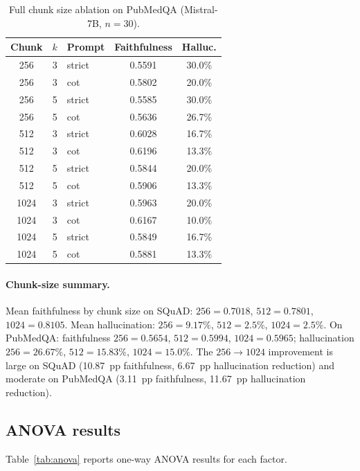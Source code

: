 \begin{table}[!htb]
\centering
\caption{Full chunk size ablation on PubMedQA (Mistral-7B, $n = 30$).}
\label{tab:ablation_pubmedqa}
\small
\begin{tabular}{cclcc}
\toprule
Chunk & $k$ & Prompt & Faithfulness & Halluc. \\
\midrule
256  & 3 & strict & 0.5591 & 30.0\% \\
256  & 3 & cot    & 0.5802 & 20.0\% \\
256  & 5 & strict & 0.5585 & 30.0\% \\
256  & 5 & cot    & 0.5636 & 26.7\% \\
\midrule
512  & 3 & strict & 0.6028 & 16.7\% \\
512  & 3 & cot    & 0.6196 & 13.3\% \\
512  & 5 & strict & 0.5844 & 20.0\% \\
512  & 5 & cot    & 0.5906 & 13.3\% \\
\midrule
1024 & 3 & strict & 0.5963 & 20.0\% \\
1024 & 3 & cot    & 0.6167 & 10.0\% \\
1024 & 5 & strict & 0.5849 & 16.7\% \\
1024 & 5 & cot    & 0.5881 & 13.3\% \\
\bottomrule
\end{tabular}
\end{table}

\paragraph{Chunk-size summary.} Mean faithfulness by chunk size on
SQuAD: $256 = 0.7018$, $512 = 0.7801$, $1024 = 0.8105$. Mean
hallucination: $256 = 9.17\%$, $512 = 2.5\%$, $1024 = 2.5\%$. On
PubMedQA: faithfulness $256 = 0.5654$, $512 = 0.5994$, $1024 = 0.5965$;
hallucination $256 = 26.67\%$, $512 = 15.83\%$, $1024 = 15.0\%$. The
$256 \to 1024$ improvement is large on SQuAD (10.87~pp faithfulness,
6.67~pp hallucination reduction) and moderate on PubMedQA (3.11~pp
faithfulness, 11.67~pp hallucination reduction).

\FloatBarrier
\subsection{ANOVA results}
\label{app:anova}

Table~\ref{tab:anova} reports one-way ANOVA results for each factor.

